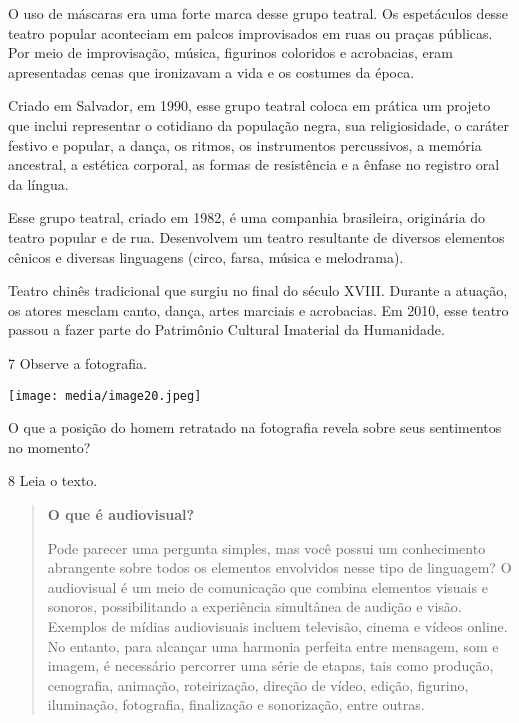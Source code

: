 \begin{boxlist}
 O uso de máscaras era uma forte marca desse grupo teatral. Os
espetáculos desse teatro popular aconteciam em palcos improvisados em
ruas ou praças públicas. Por meio de improvisação, música, figurinos
coloridos e acrobacias, eram apresentadas cenas que ironizavam a vida e
os costumes da época.

 Criado em Salvador, em 1990, esse grupo teatral coloca em prática um
projeto que inclui representar o cotidiano da população negra, sua
religiosidade, o caráter festivo e popular, a dança, os ritmos, os
instrumentos percussivos, a memória ancestral, a estética corporal, as
formas de resistência e a ênfase no registro oral da língua.

 Esse grupo teatral, criado em 1982, é uma companhia brasileira,
originária do teatro popular e de rua. Desenvolvem um teatro resultante
de diversos elementos cênicos e diversas linguagens (circo, farsa, música e
melodrama).

 Teatro chinês tradicional que surgiu no final do século XVIII. Durante a
atuação, os atores mesclam canto, dança, artes marciais e acrobacias. Em
2010, esse teatro passou a fazer parte do Patrimônio Cultural Imaterial
da Humanidade.
\end{boxlist}

\num{7} Observe a fotografia.

\texttt{[image: media/image20.jpeg]}

O que a posição do homem retratado na fotografia revela sobre seus sentimentos no momento?


\num{8} Leia o texto.

\begin{quote}
\textbf{O que é audiovisual?}

Pode parecer uma pergunta simples, mas você possui um conhecimento 
abrangente sobre todos os elementos envolvidos nesse tipo de linguagem? 
O audiovisual é um meio de comunicação que combina elementos visuais e 
sonoros, possibilitando a experiência simultânea de audição e visão. 
Exemplos de mídias audiovisuais incluem televisão, cinema e vídeos online. 
No entanto, para alcançar uma harmonia perfeita entre mensagem, som e 
imagem, é necessário percorrer uma série de etapas, tais como produção, 
cenografia, animação, roteirização, direção de vídeo, edição, figurino, 
iluminação, fotografia, finalização e sonorização, entre outras.

\end{quote}

